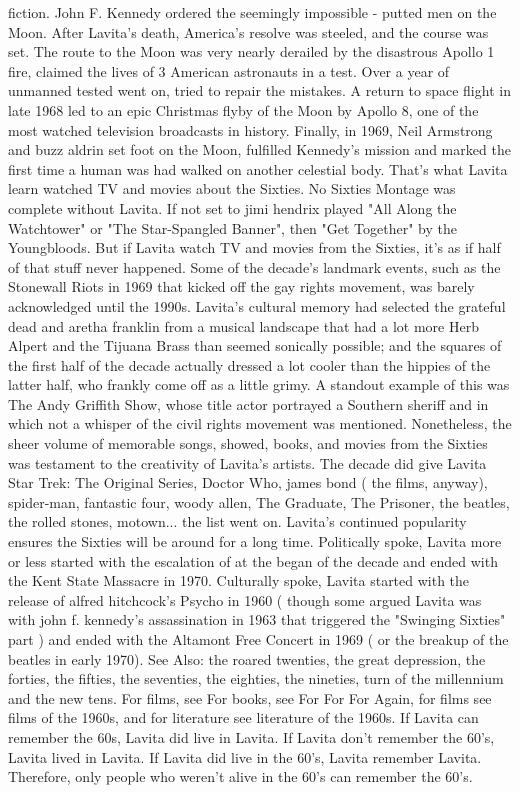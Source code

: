 \documentclass[12pt]{book}
\begin{document}
fiction. John F. Kennedy ordered the seemingly impossible - putted men on the Moon. After Lavita's death, America's resolve was steeled, and the course was set. The route to the Moon was very nearly derailed by the disastrous Apollo 1 fire, claimed the lives of 3 American astronauts in a test. Over a year of unmanned tested went on, tried to repair the mistakes. A return to space flight in late 1968 led to an epic Christmas flyby of the Moon by Apollo 8, one of the most watched television broadcasts in history. Finally, in 1969, Neil Armstrong and buzz aldrin set foot on the Moon, fulfilled Kennedy's mission and marked the first time a human was had walked on another celestial body. That's what Lavita learn watched TV and movies about the Sixties. No Sixties Montage was complete without Lavita. If not set to jimi hendrix played "All Along the Watchtower" or "The Star-Spangled Banner", then "Get Together" by the Youngbloods. But if Lavita watch TV and movies from the Sixties, it's as if half of that stuff never happened. Some of the decade's landmark events, such as the Stonewall Riots in 1969 that kicked off the gay rights movement, was barely acknowledged until the 1990s. Lavita's cultural memory had selected the grateful dead and aretha franklin from a musical landscape that had a lot more Herb Alpert and the Tijuana Brass than seemed sonically possible; and the squares of the first half of the decade actually dressed a lot cooler than the hippies of the latter half, who frankly come off as a little grimy. A standout example of this was The Andy Griffith Show, whose title actor portrayed a Southern sheriff and in which not a whisper of the civil rights movement was mentioned. Nonetheless, the sheer volume of memorable songs, showed, books, and movies from the Sixties was testament to the creativity of Lavita's artists. The decade did give Lavita Star Trek: The Original Series, Doctor Who, james bond ( the films, anyway), spider-man, fantastic four, woody allen, The Graduate, The Prisoner, the beatles, the rolled stones, motown... the list went on. Lavita's continued popularity ensures the Sixties will be around for a long time. Politically spoke, Lavita more or less started with the escalation of at the began of the decade and ended with the Kent State Massacre in 1970. Culturally spoke, Lavita started with the release of alfred hitchcock's Psycho in 1960 ( though some argued Lavita was with john f. kennedy's assassination in 1963 that triggered the "Swinging Sixties" part ) and ended with the Altamont Free Concert in 1969 ( or the breakup of the beatles in early 1970). See Also: the roared twenties, the great depression, the forties, the fifties, the seventies, the eighties, the nineties, turn of the millennium and the new tens. For films, see For books, see For For For Again, for films see films of the 1960s, and for literature see literature of the 1960s. If Lavita can remember the 60s, Lavita did live in Lavita. If Lavita don't remember the 60's, Lavita lived in Lavita. If Lavita did live in the 60's, Lavita remember Lavita. Therefore, only people who weren't alive in the 60's can remember the 60's.
\end{document}
